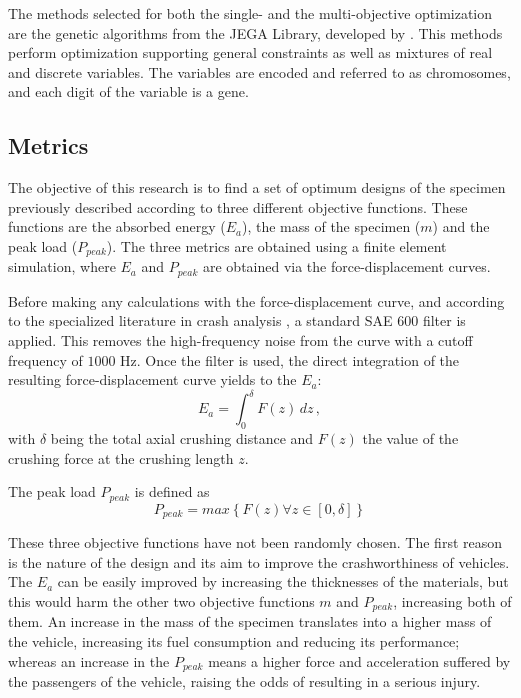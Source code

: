 \documentclass[cmfonts]{witpress}
\begin{document}
The methods selected for both the single- and the multi-objective optimization are the genetic algorithms from the JEGA Library, developed by \cite{JEGA}. This methods perform optimization supporting general constraints as well as mixtures of real and discrete variables. The variables are encoded and referred to as chromosomes, and each digit of the variable is a gene.

\subsection{Metrics}

The objective of this research is to find a set of optimum designs of the specimen previously described according to three different objective functions. These functions are the absorbed energy ($E_a$), the mass of the specimen ($m$) and the peak load ($P_{peak}$). The three metrics are obtained using a finite element simulation, where $E_a$ and $P_{peak}$ are obtained via the force-displacement curves.

Before making any calculations with the force-displacement curve, and according to the specialized literature in crash analysis \cite{Huanglibro}, a standard SAE 600 filter \cite{J211} is applied. This removes the high-frequency noise from the curve with a cutoff frequency of ${1000}$ Hz. Once the filter is used, the direct integration of the resulting force-displacement curve yields to the $E_a$:
\begin{equation}\label{Ea}
  E_{a}=\int _{0}^{\delta }F\! \left( z \right) \,dz\,,
\end{equation}
with $\delta$ being the total axial crushing distance and $F\! \left( z \right)$ the value of the crushing force at the crushing length $z$.

The peak load $P_{peak}$ is defined as
\begin{equation}\label{Peak}
 P_{peak}=max\left\{ F\! \left( z \right)  \forall z \in [0,\delta] \right\}
\end{equation}

These three objective functions have not been randomly chosen. The first reason is the nature of the design and its aim to improve the crashworthiness of vehicles. The $E_a$ can be easily improved by increasing the thicknesses of the materials, but this would harm the other two objective functions $m$ and $P_{peak}$, increasing both of them. An increase in the mass of the specimen translates into a higher mass of the vehicle, increasing its fuel consumption and reducing its performance; whereas an increase in the $P_{peak}$ means a higher force and acceleration suffered by the passengers of the vehicle, raising the odds of resulting in a serious injury.
\end{document}
